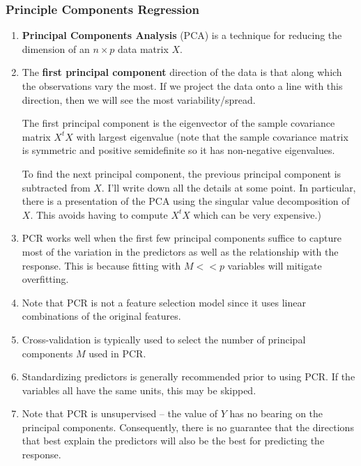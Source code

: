 \documentclass[10pt]{article}
\begin{document}
\subsubsection{Principle Components Regression} 
\begin{enumerate}
	\item \textbf{Principal Components Analysis} (PCA) is a technique for reducing the dimension of an $n \times p$ data matrix $X$.  
	\item The \textbf{first principal component} direction of the data is that along which the observations vary the most.  If we project the data onto a line with this direction, then we will see the most variability/spread. {\color{brown} The first principal component is the eigenvector of the sample covariance matrix $X^tX$ with largest eigenvalue (note that the sample covariance matrix is symmetric and positive semidefinite so it has non-negative eigenvalues.
	
	To find the next principal component, the previous principal component is subtracted from $X$.  I'll write down all the details at some point.  In particular, there is a presentation of the PCA using the singular value decomposition of $X$.  This avoids having to compute $X^tX$ which can be very expensive.)}
	\item PCR works well when the first few principal components suffice to capture most of the variation in the predictors as well as the relationship with the response.  This is because fitting with $M << p$ variables will mitigate overfitting.
	\item Note that PCR is not a feature selection model since it uses linear combinations of the original features.
	\item Cross-validation is typically used to select the number of principal components $M$ used in PCR.
	\item Standardizing predictors is generally recommended prior to using PCR.  If the variables all have the same units, this may be skipped.
	\item Note that PCR is unsupervised -- the value of $Y$ has no bearing on the principal components.  Consequently, there is no guarantee that the directions that best explain the predictors will also be the best for predicting the response.
\end{enumerate}
\end{document}
